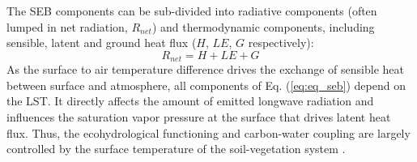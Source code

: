 \documentclass[fleqn,10pt]{wlscirep}
\begin{document}
The SEB components can be sub-divided into radiative components (often lumped in net radiation, $R_{net}$) and thermodynamic components, including sensible, latent and ground heat flux ($H$, $LE$, $G$ respectively):
\begin{equation}\label{eq:eq_seb}
R_{net} = H + LE + G 
\end{equation}
As the surface to air temperature difference drives the exchange of sensible heat between surface and atmosphere, all components of Eq. (\ref{eq:eq_seb}) depend on the LST. It directly affects the amount of emitted longwave radiation and influences the saturation vapor pressure at the surface that drives latent heat flux. Thus, the ecohydrological functioning and carbon-water coupling are largely controlled by the surface temperature of the soil-vegetation system \cite{still2021imaging}.


\end{document}
